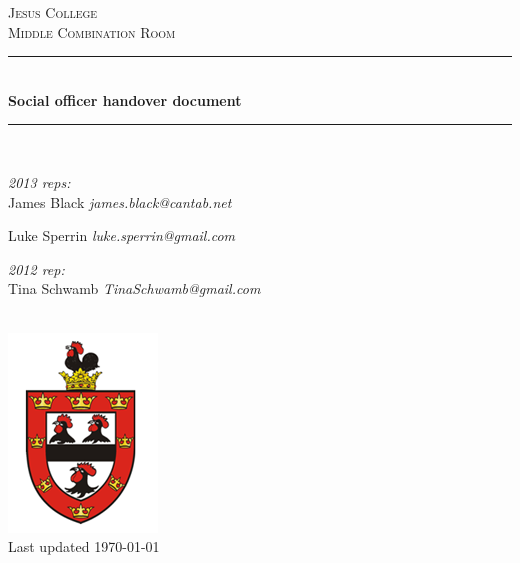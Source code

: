 \documentclass[9.5pt]{article} %
\begin{document}

\begin{titlepage}

\newcommand{\HRule}{\rule{\linewidth}{0.5mm}} %

\center %

\textsc{\Large Jesus College}\\[0.5cm] 
\textsc{\large Middle Combination Room}\\[0.5cm] 
\HRule \\[0.4cm]
{ \huge \bfseries Social officer handover document}\\[0.4cm] 
\HRule \\[1.5cm]

\begin{minipage}{0.8\textwidth}
\begin{flushleft} \large
\emph{2013 reps:}\\
James Black \emph{james.black@cantab.net}

Luke Sperrin \emph{luke.sperrin@gmail.com}


\emph{2012 rep:}\\
Tina Schwamb \emph{TinaSchwamb@gmail.com}
\end{flushleft}
\end{minipage}\\[4cm]
\includegraphics{Crest2}\\[1cm] 

{\large Last updated \today}\\[3cm] %

\vfill %

\end{titlepage}
\end{document}
